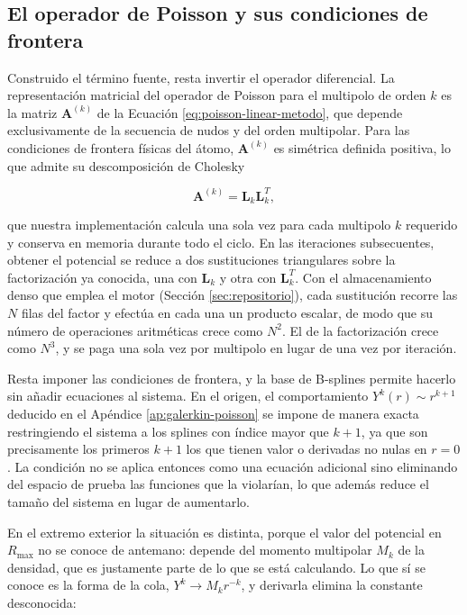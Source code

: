 \subsection{El operador de Poisson y sus condiciones de frontera}

Construido el término fuente, resta invertir el operador diferencial. La representación matricial del operador de Poisson para el multipolo de orden $k$ es la matriz $\bm{A}^{(k)}$ de la Ecuación \eqref{eq:poisson-linear-metodo}, que depende exclusivamente de la secuencia de nudos y del orden multipolar. Para las condiciones de frontera físicas del átomo, $\bm{A}^{(k)}$ es simétrica definida positiva, lo que admite su descomposición de Cholesky

\begin{equation}
  \bm{A}^{(k)} = \bm{L}_k \bm{L}_k^{T},
\end{equation}

que nuestra implementación calcula una sola vez para cada multipolo $k$ requerido y conserva en memoria durante todo el ciclo. En las iteraciones subsecuentes, obtener el potencial se reduce a dos sustituciones triangulares sobre la factorización ya conocida, una con $\bm{L}_k$ y otra con $\bm{L}_k^{T}$. Con el almacenamiento denso que emplea el motor (Sección \ref{sec:repositorio}), cada sustitución recorre las $N$ filas del factor y efectúa en cada una un producto escalar, de modo que su número de operaciones aritméticas crece como $N^2$. El de la factorización crece como $N^3$, y se paga una sola vez por multipolo en lugar de una vez por iteración.

Resta imponer las condiciones de frontera, y la base de B-splines permite hacerlo sin añadir ecuaciones al sistema. En el origen, el comportamiento $Y^k(r) \sim r^{k+1}$ deducido en el Apéndice \ref{ap:galerkin-poisson} se impone de manera exacta restringiendo el sistema a los splines con índice mayor que $k+1$, ya que son precisamente los primeros $k+1$ los que tienen valor o derivadas no nulas en $r=0$. La condición no se aplica entonces como una ecuación adicional sino eliminando del espacio de prueba las funciones que la violarían, lo que además reduce el tamaño del sistema en lugar de aumentarlo.

En el extremo exterior la situación es distinta, porque el valor del potencial en $R_{\text{max}}$ no se conoce de antemano: depende del momento multipolar $M_k$ de la densidad, que es justamente parte de lo que se está calculando. Lo que sí se conoce es la forma de la cola, $Y^k \to M_k r^{-k}$, y derivarla elimina la constante desconocida:

